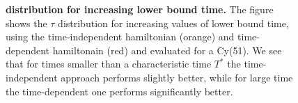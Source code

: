 
\begin{figure}[ht]
  \centering
  \caption[$\tau$ distribution for increasing lower bound time.]{\textbf{\bm{$\tau$} distribution for increasing lower bound time. }The figure shows the $\tau$ distribution for increasing values of lower bound time, using the time-independent hamiltonian (orange) and time-dependent hamiltonain (red) and evaluated for a Cy(51). We see that for times smaller than a characteristic time $T^*$ the time-independent approach performs slightly better, while for large time the time-dependent one performs significantly better.}
  \label{fig:tau_increasing_time}
\end{figure}
